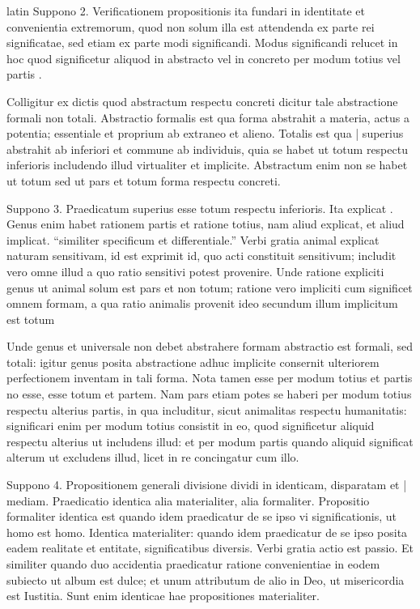\begin{otherlanguage*}{latin}
\pstart
  Suppono 2. Verificationem propositionis ita fundari in identitate et convenientia extremorum, quod non solum illa est attendenda ex parte rei significatae, sed etiam ex parte modi significandi. Modus significandi relucet in hoc quod significetur aliquod in abstracto vel in concreto per modum totius vel partis . 
\pend

\pstart
  Colligitur ex dictis quod abstractum respectu concreti dicitur tale abstractione formali non totali. Abstractio formalis est qua forma abstrahit a materia, actus a potentia; essentiale et proprium ab extraneo et alieno. Totalis est qua \textnormal{|}   superius abstrahit ab inferiori et commune ab individuis, quia se habet ut totum respectu inferioris includendo illud virtualiter et implicite. Abstractum enim non se habet ut totum sed ut pars et totum forma respectu concreti. 
\pend

\pstart
  Suppono 3. Praedicatum superius esse totum respectu inferioris. Ita explicat . Genus enim habet rationem partis et ratione totius, nam aliud explicat, et aliud implicat. \enquote{similiter specificum et differentiale.} Verbi gratia animal explicat naturam sensitivam, id est exprimit id, quo acti constituit sensitivum; includit vero omne illud a quo ratio sensitivi potest provenire. Unde ratione expliciti genus ut animal solum est pars et non totum; ratione vero impliciti cum significet omnem formam, a qua ratio animalis provenit ideo secundum illum implicitum est totum 
\pend

\pstart
  Unde genus et universale non debet abstrahere formam abstractio est formali, sed totali: igitur genus posita abstractione adhuc implicite consernit ulteriorem perfectionem inventam in tali forma. Nota tamen esse per modum totius et partis no esse, esse totum et partem. Nam pars etiam potes se haberi per modum totius respectu alterius partis, in qua includitur, sicut animalitas respectu humanitatis: significari enim per modum totius consistit in eo, quod significetur aliquid respectu alterius ut includens illud: et per modum partis quando aliquid significat alterum ut excludens illud, licet in re concingatur cum illo. 
\pend

\pstart
  Suppono 4. Propositionem generali divisione dividi in identicam, disparatam et \textnormal{|} mediam. Praedicatio identica alia materialiter, alia formaliter. Propositio formaliter identica est quando idem praedicatur de se ipso vi significationis, ut homo est homo. Identica materialiter: quando idem praedicatur de se ipso posita eadem realitate et entitate, significatibus diversis. Verbi gratia actio est passio. Et similiter quando duo accidentia praedicatur ratione convenientiae in eodem subiecto ut album est dulce; et unum attributum de alio in Deo, ut misericordia est Iustitia. Sunt enim identicae hae propositiones materialiter. 
\pend


\end{otherlanguage*}
